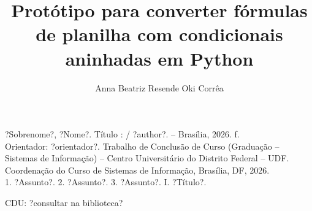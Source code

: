 \documentclass[
	12pt,	
    oneside,
    a4paper,
    brazil  
]{abntex2}
\title{Protótipo para converter fórmulas de planilha com condicionais aninhadas em Python}
\subtitle{}
\author{Anna Beatriz Resende Oki Corrêa}
\begin{document}
 
\pagestyle{empty}
\maketitle
\newpage


\section*{}
\vspace*{80pt}
\begin{center}
\begin{tcolorbox}[
    enhanced, %
    sharp corners, %
    width=1.0\textwidth, %
    colback=white, %
    colframe=black, %
    boxrule=3pt, %
    boxsep=20pt, %
    frame style={draw=black, double distance=4pt, double, ultra thick}, %
    ]
    ?Sobrenome?, ?Nome?. 
    \hspace{1cm} Título : \titulo / ?author?. -- Brasília, 2026. 
    \hspace{1cm} \pageref{LastPage} f. \\[2mm]
   	Orientador: ?orientador?. 
    \hspace{1cm}Trabalho de Conclusão de Curso (Graduação -- Sistemas de Informação) -- Centro Universitário do Distrito Federal -- UDF. Coordenação do Curso de Sistemas de Informação, Brasília, DF, 2026. \\[2mm]
   	1. ?Assunto?. 2. ?Assunto?. 3. ?Assunto?. I. ?Título?. \\[2mm]
   	\begin{flushright}
    CDU: ?consultar na biblioteca?
    \end{flushright}
\end{tcolorbox}
\end{center}


\newpage
\section*{}
\end{document}
